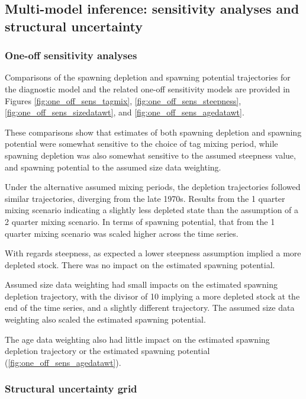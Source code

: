 \subsection{Multi-model inference: sensitivity analyses and structural uncertainty}
\label{sec:multimodel_inference}

\subsubsection{One-off sensitivity analyses}
\label{sec:oneoff_sensitivities}

Comparisons of the spawning depletion and spawning potential trajectories for the diagnostic model and the related one-off sensitivity models are provided in Figures \ref{fig:one_off_sens_tagmix}, \ref{fig:one_off_sens_steepness}, \ref{fig:one_off_sens_sizedatawt}, and \ref{fig:one_off_sens_agedatawt}.

These comparisons show that estimates of both spawning depletion and spawning potential were somewhat sensitive to the choice of tag mixing period, while spawning depletion was also somewhat sensitive to the assumed steepness value, and spawning potential to the assumed size data weighting.

Under the alternative assumed mixing periods, the depletion trajectories followed similar trajectories, diverging from the late 1970s. Results from the 1 quarter mixing scenario indicating a slightly less depleted state than the assumption of a 2 quarter mixing scenario. In terms of spawning potential, that from the 1 quarter mixing scenario was scaled higher across the time series.

With regards steepness, as expected a lower steepness assumption implied a more depleted stock. There was no impact on the estimated spawning potential.

Assumed size data weighting had small impacts on the estimated spawning depletion trajectory, with the divisor of 10 implying a more depleted stock at the end of the time series, and a slightly different trajectory. The assumed size data weighting also scaled the estimated spawning potential.

The age data weighting also had little impact on the estimated spawning depletion trajectory or the estimated spawning potential (\autoref{fig:one_off_sens_agedatawt}).

\subsubsection{Structural uncertainty grid}
\label{sec:structural_uncertainty_analysis}

